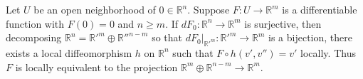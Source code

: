 Let $U$ be an open neighborhood of $0 \in \mathbb{R}^n$. Suppose $F: U \rightarrow \mathbb{R}^m$ is a differentiable function with $F(0) = 0$ and $n \geq m$. If $dF_0: \mathbb{R}^n \rightarrow \mathbb{R}^m$ is surjective, then decomposing $\mathbb{R}^n = \mathbb{R}'^m \oplus \mathbb{R}''^{n-m}$ so that $dF_0|_{\mathbb{R}'^m}: \mathbb{R}'^m \rightarrow \mathbb{R}^m$ is a bijection, there exists a local diffeomorphism $h$ on $\mathbb{R}^n$ such that $F \circ h(v', v'') = v'$ locally. Thus $F$ is locally equivalent to the projection $\mathbb{R}^m \oplus \mathbb{R}^{n-m} \rightarrow \mathbb{R}^m$.
